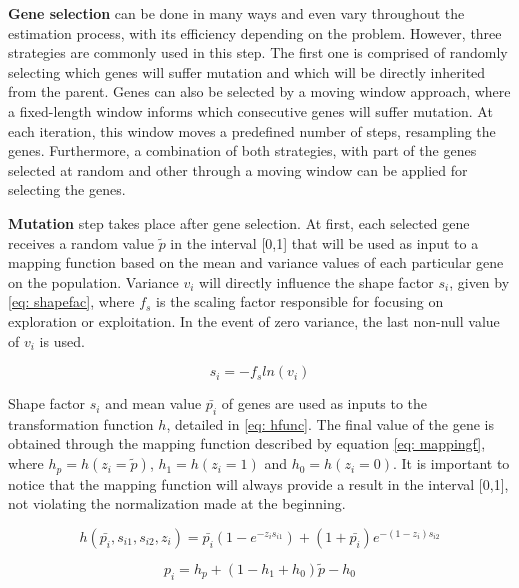 \textbf{Gene selection} can be done in many ways and even vary throughout the estimation process, with its efficiency depending on the problem. However, three strategies are commonly used in this step. The first one is comprised of randomly selecting which genes will suffer mutation and which will be directly inherited from the parent. Genes can also be selected by a moving window approach, where a fixed-length window informs which consecutive genes will suffer mutation. At each iteration, this window moves a predefined number of steps, resampling the genes. Furthermore, a combination of both strategies, with part of the genes selected at random and other through a moving window can be applied for selecting the genes.

\textbf{Mutation} step takes place after gene selection. At first, each selected gene receives a random value $\tilde{p}$ in the interval [0,1] that will be used as input to a mapping function based on the mean and variance values of each particular gene on the population. Variance $v_{i}$ will directly influence the shape factor $s_{i}$,  given by \eqref{eq: shapefac}, where $f_{s}$ is the scaling factor responsible for focusing on exploration or exploitation. In the event of zero variance, the last non-null value of $v_{i}$ is used.

\begin{equation}
	s_{i} = -f_{s}ln(v_{i})
	\label{eq: shapefac}
\end{equation}

Shape factor $s_{i}$ and mean value $\bar{p_{i}}$ of genes are used as inputs to the transformation function $h$, detailed in \eqref{eq: hfunc}. The final value of the gene is obtained through the mapping function described by equation \eqref{eq: mappingf}, where $h_{p} = h(z_{i} = \tilde{p})$, $h_{1} = h(z_{i} = 1)$ and $h_{0} = h(z_{i} = 0)$. It is important to notice that the mapping function will always provide a result in the interval [0,1], not violating the normalization made at the beginning.

\begin{equation}
	h(\bar{p_{i}}, s_{i1}, s_{i2}, z_{i}) = \bar{p_{i}}(1 - e^{-z_{i}s_{i1}}) + (1 + \bar{p_{i}})e^{-(1 - z_{i})s_{i2}}
	\label{eq: hfunc}
\end{equation}

\begin{equation}
	p_{i} = h_{p} + (1 - h_{1} + h_{0})\tilde{p} - h_{0}
	\label{eq: mappingf}
\end{equation}

